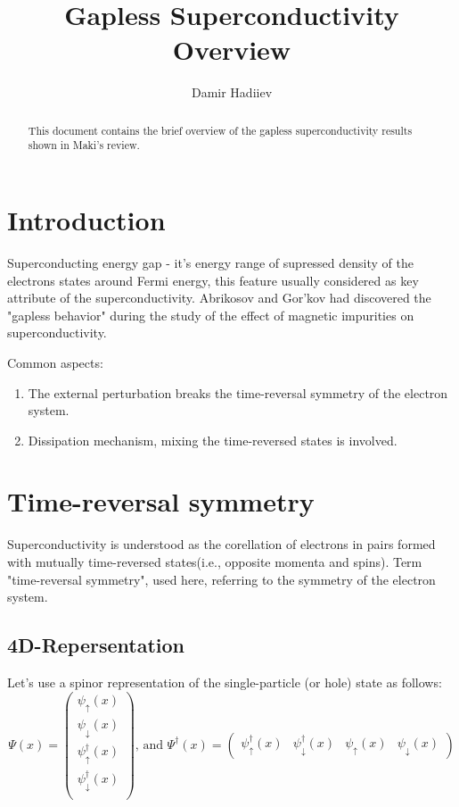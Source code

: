 \documentclass{article}
\begin{document}
\title{Gapless Superconductivity Overview}
\author{Damir Hadiiev}

\maketitle

\begin{abstract}
This document contains the brief overview of the gapless superconductivity results
shown in Maki's review.
\end{abstract}



\section{Introduction}

Superconducting energy gap - it's energy range of supressed density of the electrons
states around Fermi energy, this feature usually considered as key attribute of 
the superconductivity. Abrikosov and Gor'kov had discovered the "gapless behavior"
during the study of the effect of magnetic impurities on superconductivity.

Common aspects:
\begin{enumerate}
\item The external perturbation breaks the time-reversal symmetry of the electron system.
\item Dissipation mechanism, mixing the time-reversed states is involved.
\end{enumerate}

\section{Time-reversal symmetry}

Superconductivity is understood as the corellation of electrons in pairs formed with
mutually time-reversed states(i.e., opposite momenta and spins). Term "time-reversal
symmetry", used here, referring to the symmetry of the electron system.

\subsection {4D-Repersentation}
Let's use a spinor representation of the single-particle (or hole) state as follows:
\begin{equation}
\Psi(x)=
\begin{pmatrix}
    \psi_\uparrow(x) \\
    \psi_\downarrow(x) \\
    \psi^\dagger_\uparrow(x) \\
    \psi^\dagger_\downarrow(x) \\
\end{pmatrix}
\textrm{, and }
\Psi^\dagger(x)=
\begin{pmatrix}
    \psi^\dagger_\uparrow(x) & \psi^\dagger_\downarrow(x) & \psi_\uparrow(x) & \psi_\downarrow(x)
\end{pmatrix}
\end{equation}
\end{document}
